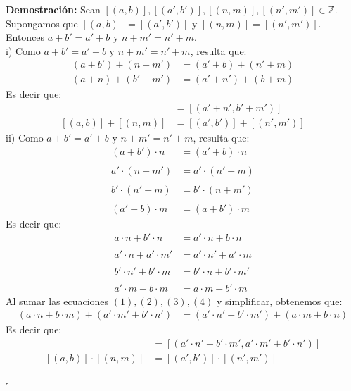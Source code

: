 \documentclass[10 pt]{article}
\begin{document}
\Large{\textbf{Demostración:} Sean $[(a,b)],[(a',b')],[(n,m)],[(n',m')] \in \mathbb Z$. Supongamos que $[(a,b)]=[(a',b')]$ y $[(n,m)]=[(n',m')]$. Entonces $a+b'=a'+b$ y $n+m'=n'+m$. \\

i) Como $a+b'=a'+b$ y $n+m'=n'+m$, resulta que:}
\begin{align*}
    (a+b')+(n+m')&=(a'+b)+(n'+m) \\
    (a+n)+(b'+m')&=(a'+n')+(b+m) 
\end{align*}
\Large{Es decir que:}
\begin{align*}
    [(a+n,b+m)]&=[(a'+n',b'+m')] \\
    [(a,b)]+[(n,m)]&=[(a',b')]+[(n',m')]
\end{align*}
\Large{ii) Como $a+b'=a'+b$ y $n+m'=n'+m$, resulta que:}
\begin{align*}
    (a+b') \cdot n&=(a'+b) \cdot n \\ \\
    a' \cdot (n+m')&=a' \cdot (n'+m) \\ \\
    b' \cdot (n'+m)&=b' \cdot (n+m') \\ \\
    (a'+b) \cdot m&=(a+b') \cdot m
\end{align*}
\Large{Es decir que:}
\begin{align*}
    a \cdot n+b' \cdot n&=a' \cdot n+b \cdot n \tag{1} \\ \\
    a' \cdot n+a' \cdot m'&=a' \cdot n'+a' \cdot m \tag{2} \\ \\
    b' \cdot n'+b' \cdot m&=b' \cdot n+b' \cdot m' \tag{3} \\ \\
    a' \cdot m+b \cdot m&=a \cdot m+b' \cdot m \tag{4}
\end{align*}
\Large{Al sumar las ecuaciones $(1),(2),(3),(4)$ y simplificar, obtenemos que:}
\begin{align*}
    (a \cdot n+b \cdot m)+(a' \cdot m'+b' \cdot n')&=(a' \cdot n'+b' \cdot m')+(a \cdot m+b \cdot n)
\end{align*}
\Large{Es decir que:}
\begin{align*}
    [(a \cdot n+b \cdot m,a \cdot m+b \cdot n)]&=[(a' \cdot n'+b' \cdot m',a' \cdot m'+b' \cdot n')] \\
    [(a,b)] \cdot [(n,m)]&=[(a',b')] \cdot [(n',m')]
\end{align*}
\begin{flushright}
    $\square$
\end{flushright}
\end{document}
